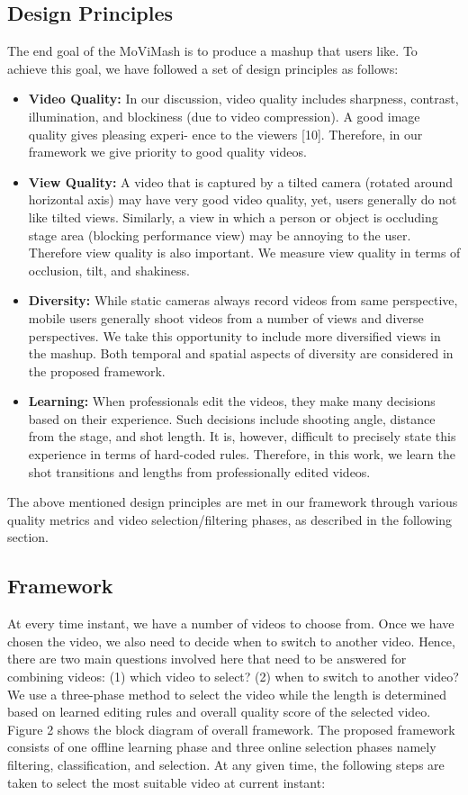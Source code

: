 \documentclass{sig-alternate}
\begin{document}
\subsection{Design Principles}
The end goal of the MoViMash is to produce a mashup that users
like. To achieve this goal, we have followed a set of design principles as follows:
\begin{itemize}
    \item \textbf{Video Quality: }In our discussion, video quality includes
sharpness, contrast, illumination, and blockiness (due to video
compression). A good image quality gives pleasing experi-
ence to the viewers [10]. Therefore, in our framework we
give priority to good quality videos.
    \item \textbf{View Quality: }A video that is captured by a tilted camera
(rotated around horizontal axis) may have very good video
quality, yet, users generally do not like tilted views. Similarly, a view in which a person or object is occluding stage area (blocking performance view) may be annoying to the user. Therefore view quality is also important. We measure view quality in terms of occlusion, tilt, and shakiness.
    \item \textbf{Diversity: }While static cameras always record videos from
same perspective, mobile users generally shoot videos from
a number of views and diverse perspectives. We take this
opportunity to include more diversified views in the mashup.
Both temporal and spatial aspects of diversity are considered
in the proposed framework.
    \item \textbf{Learning: }When professionals edit the videos, they make
many decisions based on their experience. Such decisions
include shooting angle, distance from the stage, and shot
length. It is, however, difficult to precisely state this experience in terms of hard-coded rules. Therefore, in this work, we learn the shot transitions and lengths from professionally
edited videos.
\end{itemize}
The above mentioned design principles are met in our framework
through various quality metrics and video selection/filtering phases,
as described in the following section.

\subsection{Framework}
At every time instant, we have a number of videos to choose
from. Once we have chosen the video, we also need to decide when
to switch to another video. Hence, there are two main questions
involved here that need to be answered for combining videos: (1)
which video to select? (2) when to switch to another video? We
use a three-phase method to select the video while the length is
determined based on learned editing rules and overall quality score
of the selected video. Figure 2 shows the block diagram of overall framework. The
proposed framework consists of one offline learning phase and three online selection phases namely filtering, classification, and selection. At any given time, the following steps are taken to select the
most suitable video at current instant:
\end{document}
